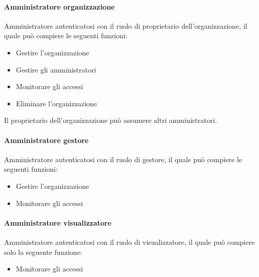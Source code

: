 \paragraph{Amministratore organizzazione}
Amministratore autenticatosi con il ruolo di proprietario dell'organizzazione, il quale può compiere le seguenti funzioni:
\begin{itemize}
\item Gestire l'organizzazione
\item Gestire gli amministratori
\item Monitorare gli accessi
\item Eliminare l'organizzazione
\end{itemize}
Il proprietario dell'organizzazione può assumere altri amministratori.
\paragraph{Amministratore gestore}
Amministratore autenticatosi con il ruolo di gestore, il quale può compiere le seguenti funzioni:
\begin{itemize}
\item Gestire l'organizzazione
\item Monitorare gli accessi
\end{itemize}
\paragraph{Amministratore visualizzatore}
Amministratore autenticatosi con il ruolo di visualizzatore, il quale può compiere solo la seguente funzione:
\begin{itemize}
\item Monitorare gli accessi
\end{itemize}


